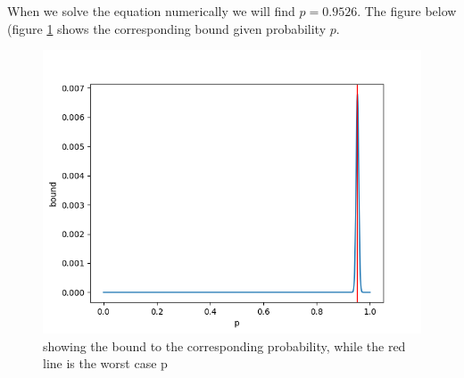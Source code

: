When we solve the equation numerically we will find $p=0.9526$.
 The figure below (figure \ref{fig:ex3} shows the corresponding bound given probability $p$.

\begin{figure}[!htb]
	\center
	\includegraphics[width=\textwidth]{code/ex3}
	\caption{showing the bound to the corresponding probability, while the red line is the worst case p}
	\label{fig:ex3}
\end{figure}